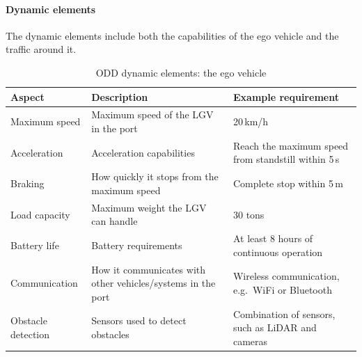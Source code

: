 \paragraph{Dynamic elements}
The dynamic elements include both the capabilities of the ego vehicle and the traffic around it.

\begin{table}[H]
    \centering
    \small
    \begin{tabular}{|p{2.6cm}|p{5.8cm}|p{6.8cm}|}
        \hline
        \textbf{Aspect} & \textbf{Description} & \textbf{Example requirement} \\
        \hline
        Maximum speed & Maximum speed of the LGV in the port & 20\,km/h \\
        \hline
        Acceleration & Acceleration capabilities & Reach the maximum speed from standstill within 5\,s \\
        \hline
        Braking & How quickly it stops from the maximum speed & Complete stop within 5\,m \\
        \hline
        Load capacity & Maximum weight the LGV can handle & 30 tons \\
        \hline
        Battery life & Battery requirements & At least 8 hours of continuous operation \\
        \hline
        Communication & How it communicates with other vehicles/systems in the port & Wireless communication, e.g.\ WiFi or Bluetooth \\
        \hline
        Obstacle detection & Sensors used to detect obstacles & Combination of sensors, such as LiDAR and cameras \\
        \hline
    \end{tabular}
    \caption{ODD dynamic elements: the ego vehicle}
\end{table}

